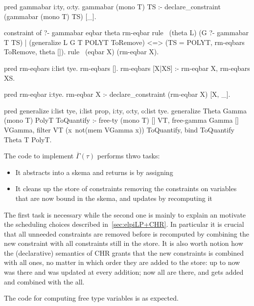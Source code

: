 \documentclass[a4paper, 11pt]{book}
\begin{document}
\begin{elpicode}
pred gammabar i:ty, o:ty.
gammabar (mono T) TS :- declare_constraint (gammabar (mono T) TS) [_].

constraint of ?- gammabar eqbar theta rm-eqbar {
  rule  \ (theta L)
          (G ?- gammabar T TS)     %
        | (generalize L G T POLYT ToRemove) %
      <=> (TS = POLYT, rm-eqbars ToRemove, theta []).             %
  rule \ (eqbar X) (rm-eqbar X).
}

pred rm-eqbars i:list tye.
rm-eqbars [].
rm-eqbars [X|XS] :- rm-eqbar X, rm-eqbars XS.

pred rm-eqbar i:tye.
rm-eqbar X :- declare_constraint (rm-eqbar X) [X, _].

pred generalize i:list tye, i:list prop, i:ty, o:ty, o:list tye.
generalize Theta Gamma (mono T) PolyT ToQuantify :-
  free-ty (mono T) [] VT,
  free-gamma Gamma [] VGamma,
  filter VT (x\ not(mem VGamma x)) ToQuantify,
  bind ToQuantify Theta T PolyT.
\end{elpicode}

The code to implement $\overline{\Gamma}(\tau)$ performs thwo tasks:

\begin{itemize}
  \item It abstracts  into a skema  and
    returns is by assigning 
  \item It cleans up the store of constraints removing the 
    constraints on variables that are now bound in the skema, and updates
     by recomputing it
\end{itemize}

The first task is necessary while the second one is mainly to explain an motivate
the scheduling choices described in~\ref{sec:elpiLP+CHR}. In particular it is crucial
that all unneeded  constraints are removed before
 is recomputed by combining the new constraint with all
 constraints still in the store. It is also worth notion how
the (declarative) semantics of CHR grants that the new 
constraints is combined with all  ones, no matter in
which order they are added to the store: up to now  was
there and was updated at every  addition; now all
 are there, and  gets added and combined
with the all.

The code for computing free type variables is as expected.
\end{document}
